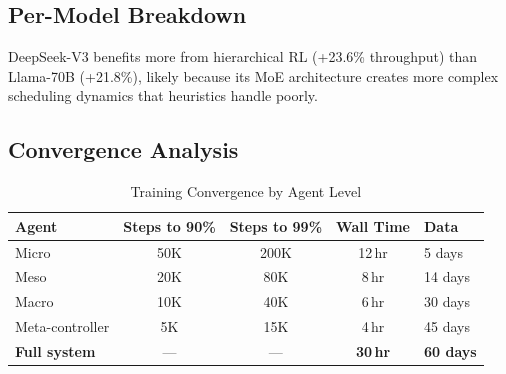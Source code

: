 \documentclass[conference,10pt]{IEEEtran}
\begin{document}
\subsection{Per-Model Breakdown}

\begin{table}[!htbp]
\caption{Performance by Model (Hierarchical RL vs.\ Heuristic)}
\label{tab:permodel}
\centering\scriptsize
{}
\end{table}

DeepSeek-V3 benefits more from hierarchical RL (+23.6\% throughput) than Llama-70B (+21.8\%), likely because its MoE architecture creates more complex scheduling dynamics that heuristics handle poorly.

\subsection{Convergence Analysis}

\begin{table}[!htbp]
\caption{Training Convergence by Agent Level}
\label{tab:convergence}
\centering\scriptsize
\begin{tabular}{@{}lcccl@{}}
\toprule
\textbf{Agent} & \textbf{Steps to 90\%} & \textbf{Steps to 99\%} & \textbf{Wall Time} & \textbf{Data} \\
\midrule
Micro & 50K & 200K & 12\,hr & 5 days \\
Meso & 20K & 80K & 8\,hr & 14 days \\
Macro & 10K & 40K & 6\,hr & 30 days \\
Meta-controller & 5K & 15K & 4\,hr & 45 days \\
\midrule
\textbf{Full system} & --- & --- & \textbf{30\,hr} & \textbf{60 days} \\
\bottomrule
\end{tabular}
\end{table}
\end{document}
